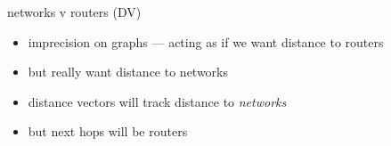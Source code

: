 \usetikzlibrary{fit,matrix}
\usetikzlibrary{arrows.meta,calc,shapes}
\providecommand{\computer}{%
    \texttt{[image: ../common/Noun\_project\_216.pdf]}
}
\providecommand{\computerAlt}{%
    \texttt{[image: ../common/Noun\_project\_alt\_cpu.pdf]}
}
\providecommand{\switch}{%
    \texttt{[image: ../common/fig-switch.pdf]}
}
\providecommand{\router}{%
    \texttt{[image: ../common/fig-router.pdf]}
}
\begin{frame}{networks v routers (DV)}
    \begin{itemize}
    \item imprecision on graphs --- acting as if we want distance to routers
    \item but really want distance to networks
    \vspace{.5cm}
    \item distance vectors will track distance to \textit{networks}
    \item but next hops will be routers
    \end{itemize}
\end{frame}


